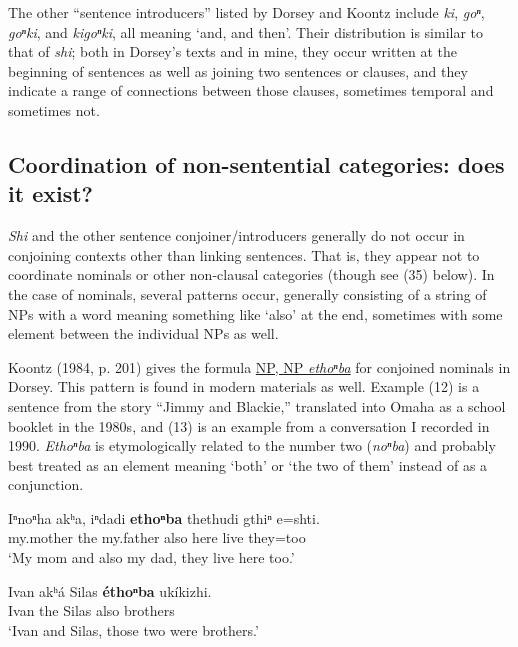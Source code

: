 \documentclass[output=paper]{LSP/langsci}
\begin{document}
The other ``sentence introducers'' listed by Dorsey and Koontz include \textit{ki}, \textit{goⁿ}, \textit{goⁿki}, and \textit{kigoⁿki}, all meaning `and, and then'. Their distribution is similar to that of \textit{shi}; both in Dorsey's texts and in mine, they occur written at the beginning of sentences as well as joining two sentences or clauses, and they indicate a range of connections between those clauses, sometimes temporal and sometimes not. 

\subsection{Coordination of non-sentential categories: does it exist?}

\textit{Shi} and the other sentence conjoiner/introducers generally do not occur in conjoining contexts other than linking sentences. That is, they appear not to coordinate nominals or other non-clausal categories (though see (35) below).  In the case of nominals, several patterns occur, generally consisting of a string of NPs with a word meaning something like `also' at the end, sometimes with some element between the individual NPs as well.  

Koontz (1984, p. 201) gives the formula \underline{NP, NP \textit{ethoⁿba}} for conjoined nominals in Dorsey.  This pattern is found in modern materials as well.  Example (12) is a sentence from the story ``Jimmy and Blackie,'' translated into Omaha as a school booklet in the 1980s, and (13) is an example from a conversation I recorded in 1990. \textit{Ethoⁿba} is etymologically related to the number two (\textit{noⁿba}) and probably best treated as an element meaning `both' or `the two of them' instead of as a conjunction.

\begin{exe}
\ex 
\gll  Iⁿnoⁿha  	akʰa, iⁿdadi    \textbf{ethoⁿba} 	thethudi 	gthiⁿ 	e=shti.  \\
	my.mother 	the  	my.father 	also        	here       	live   	they=too\\
\trans `My mom and also my dad, they live here too.'

\ex 
\gll  Ivan 	akʰ\'a Silas 	\textbf{\'ethoⁿba} uk\'ikizhi. \\         
Ivan the   Silas	 also       	brothers\\
\trans`Ivan and Silas, those two were brothers.'
\end{exe}
\end{document}

